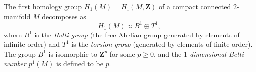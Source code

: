 The first homology group $H_1(M) = H_1(M, \mathbf{Z})$ of a compact connected $2$-manifold $M$ decomposes as
$$H_1(M) \approx B^1 \oplus T^1,$$
where $B^1$ is the \emph{Betti group} (the free Abelian group generated by elements of infinite order) and $T^1$ is the \emph{torsion group} (generated by elements of finite order). The group $B^1$ is isomorphic to $\mathbf{Z}^{p}$ for some $p \geqslant 0$, and the \emph{$1$-dimensional Betti number} $p^1(M)$ is defined to be $p$.
